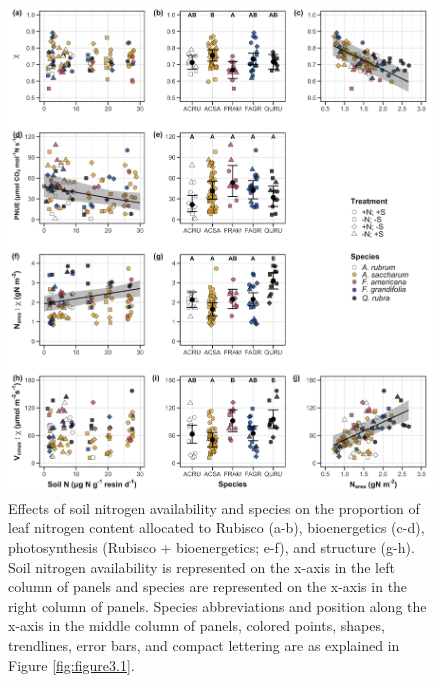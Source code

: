 \newpage
\begin{figure}
    \includegraphics[width=\textwidth]{ch3_NxpH/figs/NxS_fig4_pnueiwue.jpg}
    \centering
    \caption[Effects of soil N availability, species, and leaf N content on tradeoffs between nitrogen and water use]{Effects of soil nitrogen availability and species on the proportion of leaf nitrogen content allocated to Rubisco (a-b), bioenergetics (c-d), photosynthesis (Rubisco + bioenergetics; e-f), and structure (g-h). Soil nitrogen availability is represented on the x-axis in the left column of panels and species are represented on the x-axis in the right column of panels. Species abbreviations and position along the x-axis in the middle column of panels, colored points, shapes, trendlines, error bars, and compact lettering are as explained in Figure \ref{fig:figure3.1}.}
    \label{fig:figure3.4}
\end{figure}
\clearpage

